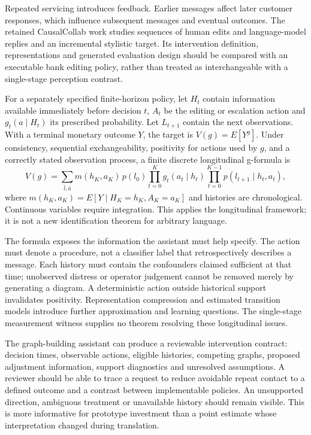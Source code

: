 Repeated servicing introduces feedback. Earlier messages affect later customer responses, which influence subsequent messages and eventual outcomes. The retained CausalCollab work studies sequences of human edits and language-model replies and an incremental stylistic target. Its intervention definition, representations and generated evaluation design should be compared with an executable bank editing policy, rather than treated as interchangeable with a single-stage perception contrast.~\citep{exec13_census_collaboration}

For a separately specified finite-horizon policy, let $H_t$ contain information available immediately before decision $t$, $A_t$ be the editing or escalation action and $g_t(a\mid H_t)$ its prescribed probability. Let $L_{t+1}$ contain the next observations. With a terminal monetary outcome $Y$, the target is $V(g)=E[Y^g]$. Under consistency, sequential exchangeability, positivity for actions used by $g$, and a correctly stated observation process, a finite discrete longitudinal g-formula is
\begin{equation}
 V(g)=\sum_{\bar l,\bar a}m(h_K,a_K)\,p(l_0)
 \prod_{t=0}^{K}g_t(a_t\mid h_t)
 \prod_{t=0}^{K-1}p(l_{t+1}\mid h_t,a_t),
 \label{eq:exec28-lm-policy}
\end{equation}
where $m(h_K,a_K)=E[Y\mid H_K=h_K,A_K=a_K]$ and histories are chronological. Continuous variables require integration. This applies the longitudinal framework; it is not a new identification theorem for arbitrary language.~\citep{hernan2020}

The formula exposes the information the assistant must help specify. The action must denote a procedure, not a classifier label that retrospectively describes a message. Each history must contain the confounders claimed sufficient at that time; unobserved distress or operator judgement cannot be removed merely by generating a diagram. A deterministic action outside historical support invalidates positivity. Representation compression and estimated transition models introduce further approximation and learning questions. The single-stage measurement witness supplies no theorem resolving these longitudinal issues.

The graph-building assistant can produce a reviewable intervention contract: decision times, observable actions, eligible histories, competing graphs, proposed adjustment information, support diagnostics and unresolved assumptions. A reviewer should be able to trace a request to reduce avoidable repeat contact to a defined outcome and a contrast between implementable policies. An unsupported direction, ambiguous treatment or unavailable history should remain visible. This is more informative for prototype investment than a point estimate whose interpretation changed during translation.

